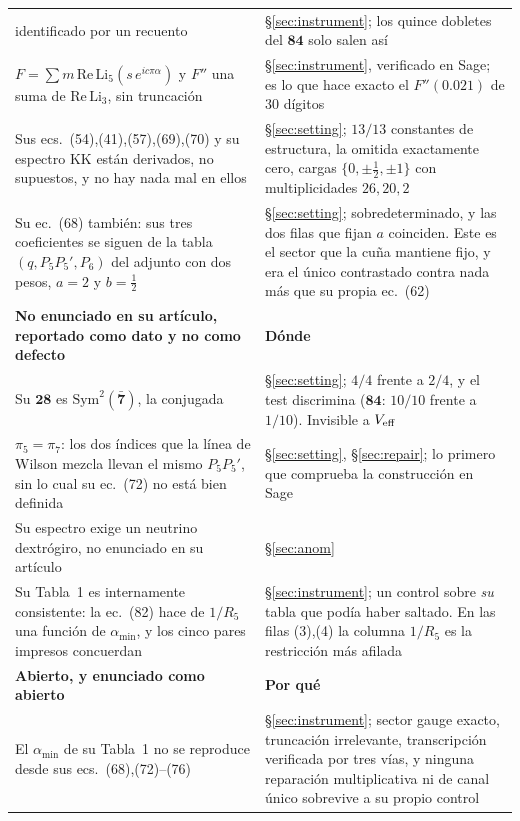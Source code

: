 \documentclass[11pt,a4paper]{article}
\newcommand{\rep}[1]{\mathbf{#1}}
\newcommand{\amin}{\alpha_{\min}}
\begin{document}
\begin{longtable}{p{}p{}}
identificado por un recuento & \S\ref{sec:instrument}; los quince dobletes del $\rep{84}$ solo salen
así\\
$F=\sum m\,\mathrm{Re}\,\mathrm{Li}_5(s\,e^{ic\pi\alpha})$ y $F''$ una suma de
$\mathrm{Re}\,\mathrm{Li}_3$, sin truncación & \S\ref{sec:instrument}, verificado en Sage; es lo que
hace exacto el $F''(0.021)$ de $30$ dígitos\\
Sus ecs.~(54),(41),(57),(69),(70) y su espectro KK están derivados, no supuestos, y no hay nada mal
en ellos & \S\ref{sec:setting}; $13/13$ constantes de estructura, la omitida exactamente cero, cargas
$\{0,\pm\tfrac12,\pm1\}$ con multiplicidades $26,20,2$\\
Su ec.~(68) también: sus tres coeficientes se siguen de la tabla $(q,P_5P_5',P_6)$ del adjunto con
dos pesos, $a=2$ y $b=\tfrac12$ & \S\ref{sec:setting}; sobredeterminado, y las dos filas que fijan
$a$ coinciden. Este es el sector que la cuña mantiene fijo, y era el único contrastado contra nada
más que su propia ec.~(62)\\
\midrule
\rowcolor{hdrblue!10}\textbf{No enunciado en su artículo, reportado como dato y no como defecto} &
\textbf{Dónde}\\
\midrule
Su $\rep{28}$ es $\mathrm{Sym}^2(\rep{\bar7})$, la conjugada & \S\ref{sec:setting}; $4/4$ frente a
$2/4$, y el test discrimina ($\rep{84}$: $10/10$ frente a $1/10$). Invisible a $V_{\rm eff}$\\
$\pi_5=\pi_7$: los dos índices que la línea de Wilson mezcla llevan el mismo $P_5P_5'$, sin lo cual
su ec.~(72) no está bien definida & \S\ref{sec:setting}, \S\ref{sec:repair}; lo primero que comprueba
la construcción en Sage\\
Su espectro exige un neutrino dextrógiro, no enunciado en su artículo & \S\ref{sec:anom}\\
Su Tabla~1 es internamente consistente: la ec.~(82) hace de $1/R_5$ una función de $\amin$, y los
cinco pares impresos concuerdan & \S\ref{sec:instrument}; un control sobre \emph{su} tabla que podía
haber saltado. En las filas (3),(4) la columna $1/R_5$ es la restricción más afilada\\
\midrule
\rowcolor{hdrblue!10}\textbf{Abierto, y enunciado como abierto} & \textbf{Por qué}\\
\midrule
El $\amin$ de su Tabla~1 no se reproduce desde sus ecs.~(68),(72)--(76) & \S\ref{sec:instrument};
sector gauge exacto, truncación irrelevante, transcripción verificada por tres vías, y ninguna
reparación multiplicativa ni de canal único sobrevive a su propio control\\

\end{longtable}
\end{document}
